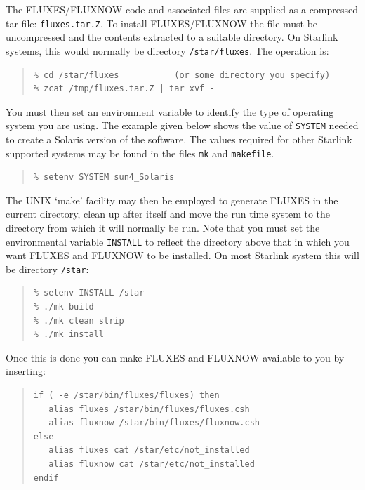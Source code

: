 \documentclass[11pt,twoside]{article}
\newenvironment{myquote}{\begin{quote}\begin{small}}{\end{small}\end{quote}}
\renewcommand{\_}{\texttt{\symbol{95}}}
\begin{document}
The FLUXES/FLUXNOW code and associated files are supplied as a compressed
tar file: {\tt{fluxes.tar.Z}}.  To install FLUXES/FLUXNOW the file must be
uncompressed and the contents extracted to a suitable directory.  On
Starlink systems, this would normally be directory {\tt{/star/fluxes}}. The
operation is:

\begin{myquote}
\begin{verbatim}
% cd /star/fluxes           (or some directory you specify)
% zcat /tmp/fluxes.tar.Z | tar xvf -
\end{verbatim}
\end{myquote}

You must then set an environment variable to identify the type of operating
system you are using. The example given below shows the value of
{\tt{SYSTEM}} needed to create a Solaris version of the software. The values
required for other Starlink supported systems may be found in the files
{\tt{mk}} and {\tt{makefile}}.

\begin{myquote}
\begin{verbatim}
% setenv SYSTEM sun4_Solaris
\end{verbatim}
\end{myquote}

The UNIX `make' facility may then be employed to generate FLUXES in the
current directory, clean up after itself and move the run time system
to the directory from which it will normally be run.  Note that you must
set the environmental variable {\tt{INSTALL}} to reflect the directory
above that in which you want FLUXES and FLUXNOW to be installed. On
most Starlink system this will be directory {\tt{/star}}:

\begin{myquote}
\begin{verbatim}
% setenv INSTALL /star
% ./mk build
% ./mk clean strip
% ./mk install
\end{verbatim}
\end{myquote}

Once this is done you can make FLUXES and FLUXNOW available to you
by inserting:

\begin{myquote}
\begin{verbatim}
if ( -e /star/bin/fluxes/fluxes) then
   alias fluxes /star/bin/fluxes/fluxes.csh
   alias fluxnow /star/bin/fluxes/fluxnow.csh
else
   alias fluxes cat /star/etc/not_installed
   alias fluxnow cat /star/etc/not_installed
endif
\end{verbatim}
\end{myquote}
\end{document}
